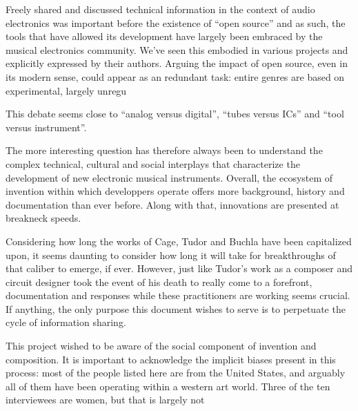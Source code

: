Freely shared and discussed technical information in the context of audio electronics was important before the existence of ``open source'' and as such, the tools that have allowed its development have largely been embraced by the musical electronics community. We've seen this embodied in various projects and explicitly expressed by their authors. Arguing the impact of open source, even in its modern sense, could  appear as an redundant task: entire genres are based on experimental, largely unregu


 This debate seems close to ``analog versus digital'', ``tubes versus ICs'' and ``tool versus instrument''. 

The more interesting question has therefore always been to understand the complex technical, cultural and social interplays that characterize the development of new electronic musical instruments. Overall, the ecosystem of invention within which developpers operate offers more background, history and documentation than ever before. Along with that, innovations are presented at breakneck speeds. 

Considering how long the works of Cage, Tudor and Buchla have been capitalized upon, it seems daunting to consider how long it will take for breakthroughs of that caliber to emerge, if ever. However, just like Tudor's work as a composer and circuit designer took the event of his death to really come to a forefront, documentation and responses while these practitioners are working seems crucial. If anything, the only purpose this document wishes to serve is to perpetuate the cycle of information sharing. 

This project wished to be aware of the social component of invention and composition. It is important to acknowledge the implicit biases present in this process: most of the people listed here are from the United States, and arguably all of them have been operating within a western art world. Three of the ten interviewees are women, but that is largely not 